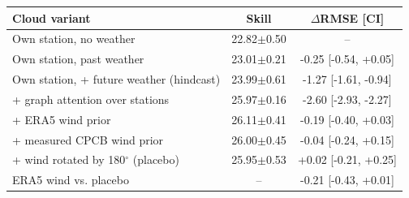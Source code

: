 \begin{tabular}{|p{4.3cm}|c|c|}
\hline
Cloud variant & Skill & $\Delta$RMSE [CI] \\
\hline
Own station, no weather & 22.82$\pm$0.50 & -- \\
Own station, past weather & 23.01$\pm$0.21 & -0.25 [-0.54, +0.05] \\
Own station, + future weather (hindcast) & 23.99$\pm$0.61 & -1.27 [-1.61, -0.94] \\
+ graph attention over stations & 25.97$\pm$0.16 & -2.60 [-2.93, -2.27] \\
+ ERA5 wind prior & 26.11$\pm$0.41 & -0.19 [-0.40, +0.03] \\
+ measured CPCB wind prior & 26.00$\pm$0.45 & -0.04 [-0.24, +0.15] \\
+ wind rotated by 180$^\circ$ (placebo) & 25.95$\pm$0.53 & +0.02 [-0.21, +0.25] \\
ERA5 wind vs. placebo & -- & -0.21 [-0.43, +0.01] \\
\hline
\end{tabular}
